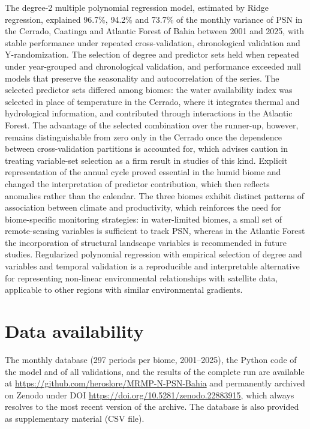 \documentclass[a4paper,fleqn]{cas-dc}
\begin{document}
The degree-2 multiple polynomial regression model, estimated by Ridge regression, explained 96.7\%, 94.2\% and 73.7\% of the monthly variance of PSN in the Cerrado, Caatinga and Atlantic Forest of Bahia between 2001 and 2025, with stable performance under repeated cross-validation, chronological validation and Y-randomization. The selection of degree and predictor sets held when repeated under year-grouped and chronological validation, and performance exceeded null models that preserve the seasonality and autocorrelation of the series. The selected predictor sets differed among biomes: the water availability index was selected in place of temperature in the Cerrado, where it integrates thermal and hydrological information, and contributed through interactions in the Atlantic Forest. The advantage of the selected combination over the runner-up, however, remains distinguishable from zero only in the Cerrado once the dependence between cross-validation partitions is accounted for, which advises caution in treating variable-set selection as a firm result in studies of this kind. Explicit representation of the annual cycle proved essential in the humid biome and changed the interpretation of predictor contribution, which then reflects anomalies rather than the calendar. The three biomes exhibit distinct patterns of association between climate and productivity, which reinforces the need for biome-specific monitoring strategies: in water-limited biomes, a small set of remote-sensing variables is sufficient to track PSN, whereas in the Atlantic Forest the incorporation of structural landscape variables is recommended in future studies. Regularized polynomial regression with empirical selection of degree and variables and temporal validation is a reproducible and interpretable alternative for representing non-linear environmental relationships with satellite data, applicable to other regions with similar environmental gradients.

\section*{Data availability}
The monthly database (297 periods per biome, 2001--2025), the Python code of the model and of all validations, and the results of the complete run are available at \url{https://github.com/heroslore/MRMP-N-PSN-Bahia} and permanently archived on Zenodo under DOI \url{https://doi.org/10.5281/zenodo.22883915}, which always resolves to the most recent version of the archive. The database is also provided as supplementary material (CSV file).
\end{document}
